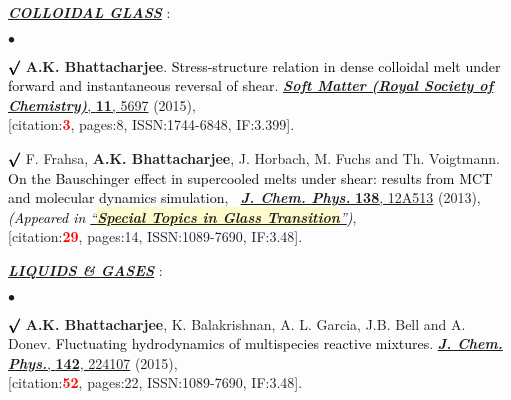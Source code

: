 \documentclass[margin,line]{res}
\newenvironment{list1}{
  \begin{list}{\ding{113}}{%
      \setlength{\itemsep}{0in}
      \setlength{\parsep}{0in} \setlength{\parskip}{0in}
      \setlength{\topsep}{0in} \setlength{\partopsep}{0in} 
      \setlength{\leftmargin}{0.17in}}}{\end{list}}
\newenvironment{list2}{
  \begin{list}{$\bullet$}{%
      \setlength{\itemsep}{0in}
      \setlength{\parsep}{0in} \setlength{\parskip}{0in}
      \setlength{\topsep}{0in} \setlength{\partopsep}{0in} 
      \setlength{\leftmargin}{0.2in}}}{\end{list}}
\begin{document}
\begin{resume}
\vspace{4mm}
\begin{list1}
\item[] \textcolor{alizarin}{\ul{\textbf{\textit{COLLOIDAL GLASS}}} :}
\end{list1}
\vspace{2mm}
\begin{list2}
\item[$\pmb\surd$] {\bf A.K. Bhattacharjee}. \textcolor{black}{\textsf{Stress-structure relation in dense colloidal melt 
under forward and instantaneous reversal of shear}}. \href{http://pubs.rsc.org/en/content/articlelanding/2015/sm/c4sm02790f}{
\underline{\textit{\textbf{Soft Matter (Royal Society of Chemistry)}}}, {\bf 11}, 5697} (2015), \\{[citation:\textcolor{red}{\bf 3}, 
pages:8, ISSN:1744-6848, IF:3.399]}. 
\vspace{4mm}
\item[$\pmb\surd$] F. Frahsa, {\bf A.K. Bhattacharjee}, J. Horbach, M. Fuchs and Th. Voigtmann. \textcolor{black}{\textsf{On the Bauschinger 
effect in supercooled melts under shear: results from MCT and molecular dynamics simulation}},$\;\;$ 
\href{https://aip.scitation.org/doi/abs/10.1063/1.4770336}{\underline{\textit{\textbf{J. Chem. Phys.}}} {\bf 138}, 12A513} (2013), 
\textcolor{black}{\small \it {(Appeared in \href{https://amitbny.github.io/akb.github.io/doc/JCP_ST.pdf}{``\colorbox{lemonchiffon}{\bf Special Topics in Glass Transition}''})}}, \\{[citation:\textcolor{red}{\bf 29}, pages:14, ISSN:1089-7690, IF:3.48]}.
\end{list2}
\vspace{4mm}
\begin{list1}
\item[] \textcolor{alizarin}{\ul{\textbf{\textit{LIQUIDS \& GASES}}} :}
\end{list1}
\vspace{2mm}
\begin{list2}
\item[$\pmb\surd$] {\bf A.K. Bhattacharjee}, K. Balakrishnan, A. L. Garcia, J.B. Bell and A. Donev. \textcolor{black}{\textsf{
Fluctuating hydrodynamics of multispecies reactive mixtures}}. \href{http://scitation.aip.org/content/aip/journal/jcp/142/22/10.1063/1.4922308}{
\underline{\textit{\textbf{J. Chem. Phys.}}}, {\bf 142}, 224107} (2015), \\{[citation:\textcolor{red}{\bf 52}, pages:22, ISSN:1089-7690, IF:3.48]}.
\vspace{4mm}

\end{list2}
\end{resume}
\end{document}
